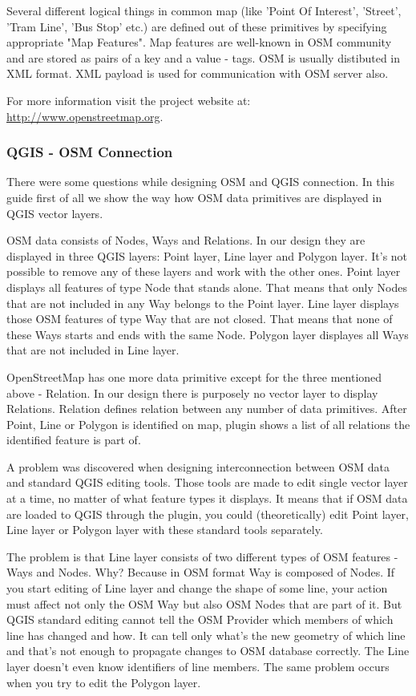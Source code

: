 Several different logical things in common map (like 'Point Of Interest',
'Street', 'Tram Line', 'Bus Stop' etc.) are defined out of these primitives
by specifying appropriate "Map Features". Map  features are well-known in OSM
community and are stored as pairs of a key and a value - tags. OSM is
usually distibuted in XML format. XML payload is used for communication with
OSM server also.

For more information visit the project website at:
\url{http://www.openstreetmap.org}.

\subsubsection{QGIS - OSM Connection}\label{qgis-osm-connection}

There were some questions while designing OSM and QGIS connection. In
this guide first of all we show the way how OSM data primitives are displayed
in QGIS vector layers.

OSM data consists of Nodes, Ways and Relations. In our design they are
displayed in three QGIS layers: Point layer, Line layer and Polygon layer.
It's not possible to remove any of these layers and work with the other ones.
Point layer displays all features of type Node that stands alone. That means
that only Nodes that are not included in any Way belongs to the Point layer.
Line layer displays those OSM features of type Way that are not closed. That
means that none of these Ways starts and ends with the same Node.
Polygon layer displayes all Ways that are not included in Line layer.

OpenStreetMap has one more data primitive except for the three mentioned
above - Relation. In our design there is purposely no vector layer to display
Relations. Relation defines relation between any number of data primitives.
After Point, Line or Polygon is identified on map, plugin shows a list of all
relations the identified feature is part of.

A problem was discovered when designing interconnection between OSM data and
standard QGIS editing tools. Those tools are made to edit single vector layer
at a time, no matter of what feature types it displays. It means that if OSM
data are loaded to QGIS through the plugin, you could (theoretically) edit
Point layer, Line layer or Polygon layer with these standard tools
separately.

The problem is that Line layer consists of two different types of OSM
features - Ways and Nodes. Why? Because in OSM format Way is composed of
Nodes. If you start editing of Line layer and change the shape of some line,
your action must affect not only the OSM Way but also OSM Nodes that are part
of it. But QGIS standard editing cannot tell the OSM Provider which members
of which line has changed and how. It can tell only what's the new geometry
of which line and that's not enough to propagate changes to OSM database
correctly. The Line layer doesn't even know identifiers of line members.
The same problem occurs when you try to edit the Polygon layer.

